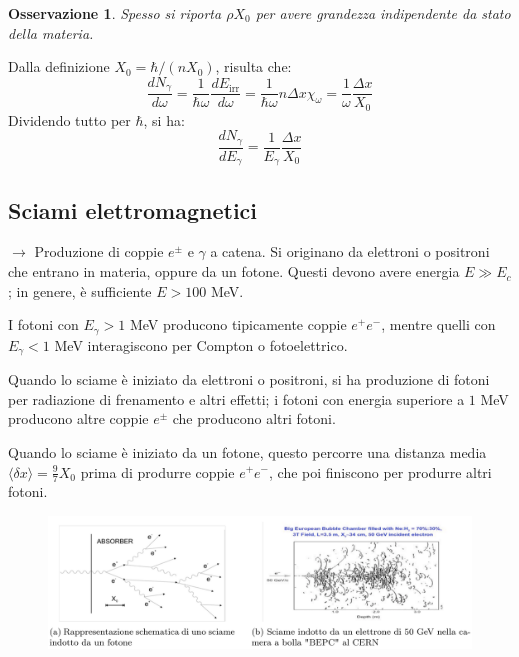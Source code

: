 \documentclass[10pt, a4paper]{scrartcl}
\numberwithin{equation}{subsection}
\theoremstyle{style1}
\newtheorem{osservazione}{Osservazione}[section]
\begin{document}
\begin{osservazione}
	Spesso si riporta $\rho X_0$ per avere grandezza indipendente da stato della materia.
\end{osservazione}

\noindent Dalla definizione $X_0 = \hbar  / (n X_0)$, risulta che:
\begin{equation}
	\frac{d N_\gamma}{d \omega} = \frac{1}{\hbar \omega} \frac{d E_\text{irr}}{d \omega} =  \frac{1}{\hbar  \omega } n\Delta x \chi _\omega = \frac{1}{\omega} \frac{\Delta x}{X_0}
\end{equation}
Dividendo tutto per $\hbar $, si ha:
\begin{equation}
	\frac{d N_\gamma}{d E_\gamma}  = \frac{1}{E_\gamma} \frac{\Delta x}{X_0}
\end{equation}

\subsection{Sciami elettromagnetici}
$\to $ Produzione di coppie $e^{\pm} $ e $\gamma$ a catena. Si originano da elettroni o positroni che entrano in materia, oppure da un fotone. Questi devono avere energia $E \gg E_c$; in genere, \`e sufficiente $E > 100 $ MeV.

I fotoni con $E_\gamma > 1$ MeV producono tipicamente coppie $e^+ e^-$, mentre quelli con $E_\gamma < 1 $ MeV interagiscono per Compton o fotoelettrico. \

Quando lo sciame \`e iniziato da elettroni o positroni, si ha produzione di fotoni per radiazione di frenamento e altri effetti; i fotoni con energia superiore a $1$ MeV producono altre coppie $e^{\pm}  $ che producono altri fotoni. 

Quando lo sciame \`e iniziato da un fotone, questo percorre una distanza media $\langle \delta x \rangle = \frac{9}{7} X_0$ prima di produrre coppie $e^+ e^-$, che poi finiscono per produrre altri fotoni.
\begin{figure}[h!]
	\centering
	\includegraphics[width=1\columnwidth]{sciami.png}
\end{figure}
\end{document}
